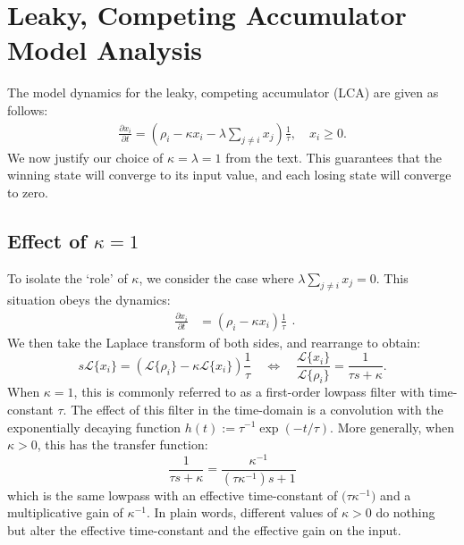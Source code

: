 \chapter{Leaky, Competing Accumulator Model Analysis}\label{sec:apdx-wta}

The model dynamics for the leaky, competing accumulator (LCA) are given as follows:
\begin{equation}
    \begin{split}
        \frac{{\partial x}_i}{\partial t} = \left(\rho_i - \kappa x_i - \lambda \sum_{j \neq i} x_j\right) \frac{1}{\tau}, \quad x_i \ge 0 .
    \end{split}
\end{equation}
We now justify our choice of $\kappa = \lambda = 1$ from the text.
This guarantees that the winning state will converge to its input value, and each losing state will converge to zero.

\section{Effect of \texorpdfstring{$\kappa = 1$}{κ=1}}

To isolate the `role' of $\kappa$, we consider the case where $\lambda \sum_{j \ne i} x_j = 0$. 
This situation obeys the dynamics:
\begin{equation}
    \begin{split}
        \frac{{\partial x}_i}{\partial t} &= \left(\rho_i - \kappa x_i\right) 
        \frac{1}{\tau}
    \end{split}.
\end{equation}
We then take the Laplace transform of both sides, and rearrange to obtain:
\begin{equation}
    s\mathcal{L}\{x_i\} = \left( \mathcal{L}\{\rho_i\} - \kappa\mathcal{L}\{x_i\} \right) \frac{1}{\tau} \quad \iff \quad \frac{\mathcal{L}\{x_i\}}{\mathcal{L}\{\rho_i\}} = \frac{1}{\tau s + \kappa}.
\end{equation}
When $\kappa = 1$, this is commonly referred to as a first-order lowpass filter with time-constant $\tau$.
The effect of this filter in the time-domain is a convolution with the exponentially decaying function $h(t) := \tau^{-1} \exp\left( -t / \tau \right)$.
More generally, when $\kappa > 0$, this has the transfer function:
\begin{equation}
    \frac{1}{\tau s + \kappa} = \frac{\kappa^{-1}}{(\tau \kappa^{-1})s + 1}
\end{equation}
which is the same lowpass with an effective time-constant of $\big(\!\tau \kappa^{-1}\big)$ and a multiplicative gain of $\kappa^{-1}$.
In plain words, different values of $\kappa > 0$ do nothing but alter the effective time-constant and the effective gain on the input.

